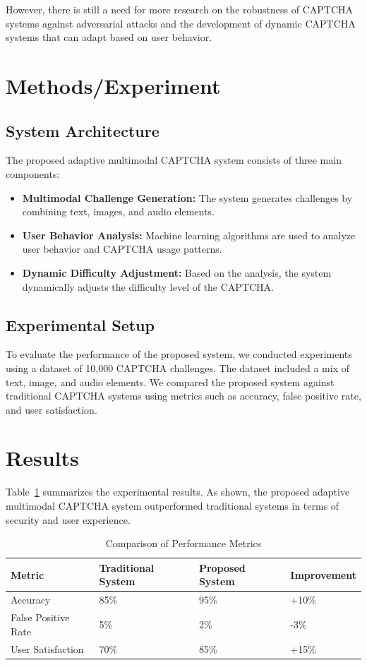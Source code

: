 \documentclass{article}
\begin{document}
However, there is still a need for more research on the robustness of CAPTCHA systems against adversarial attacks and the development of dynamic CAPTCHA systems that can adapt based on user behavior.

\section{Methods/Experiment}
\label{sec:methods-experiment}

\subsection{System Architecture}
The proposed adaptive multimodal CAPTCHA system consists of three main components: 
\begin{itemize}
    \item \textbf{Multimodal Challenge Generation:} The system generates challenges by combining text, images, and audio elements.
    \item \textbf{User Behavior Analysis:} Machine learning algorithms are used to analyze user behavior and CAPTCHA usage patterns.
    \item \textbf{Dynamic Difficulty Adjustment:} Based on the analysis, the system dynamically adjusts the difficulty level of the CAPTCHA.
\end{itemize}

\subsection{Experimental Setup}
To evaluate the performance of the proposed system, we conducted experiments using a dataset of 10,000 CAPTCHA challenges. The dataset included a mix of text, image, and audio elements. We compared the proposed system against traditional CAPTCHA systems using metrics such as accuracy, false positive rate, and user satisfaction.

\section{Results}
\label{sec:results}

Table~\ref{tab:results} summarizes the experimental results. As shown, the proposed adaptive multimodal CAPTCHA system outperformed traditional systems in terms of security and user experience.

\begin{table}[ht]
\centering
\caption{Comparison of Performance Metrics}
\label{tab:results}
\begin{tabular}{@{}llll@{}}
\toprule
Metric & Traditional System & Proposed System & Improvement \\ \midrule
Accuracy & 85\% & 95\% & +10\% \\
False Positive Rate & 5\% & 2\% & -3\% \\
User Satisfaction & 70\% & 85\% & +15\% \\ \bottomrule
\end{tabular}
\end{table}
\end{document}

